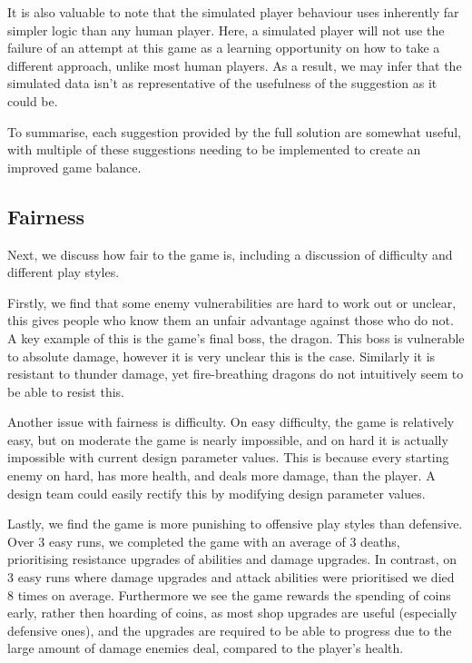 It is also valuable to note that the simulated player behaviour uses
inherently far simpler logic than any human player. Here, a simulated
player will not use the failure of an attempt at this game as a learning
opportunity on how to take a different approach, unlike most human
players. As a result, we may infer that the simulated data isn't as
representative of the usefulness of the suggestion as it could be.

To summarise, each suggestion provided by the full solution are somewhat
useful, with multiple of these suggestions needing to be implemented to
create an improved game balance.

\subsection{Fairness}


Next, we discuss how fair to the game is, including a discussion of difficulty and different play styles. 

Firstly, we find that some enemy vulnerabilities are hard to work out or unclear, this gives people who know them an unfair advantage against those who do not. A key example of this is the game's final boss, the dragon. This boss is vulnerable to absolute damage, however it is very unclear this is the case. Similarly it is resistant to thunder damage, yet fire-breathing dragons do not intuitively seem to be able to resist this. 

Another issue with fairness is difficulty. On easy difficulty, the game is relatively easy, but on moderate the game is nearly impossible, and on hard it is actually impossible with current design parameter values. This is because every starting enemy on hard, has more health, and deals more damage, than the player. A design team could easily rectify this by modifying design parameter values. 

Lastly, we find the game is more punishing to offensive play styles than defensive. Over 3 easy runs, we completed the game with an average of 3 deaths, prioritising resistance upgrades of abilities and damage upgrades. In contrast, on 3 easy runs where damage upgrades and attack abilities were prioritised we died 8 times on average. Furthermore we see the game rewards the spending of coins early, rather then hoarding of coins, as most shop upgrades are useful (especially defensive ones), and the upgrades are required to be able to progress due to the large amount of damage enemies deal, compared to the player's health. 

